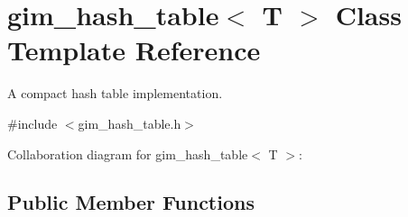 \hypertarget{classgim__hash__table}{\section{gim\+\_\+hash\+\_\+table$<$ T $>$ Class Template Reference}
\label{classgim__hash__table}
}


A compact hash table implementation.  




{\ttfamily \#include $<$gim\+\_\+hash\+\_\+table.\+h$>$}



Collaboration diagram for gim\+\_\+hash\+\_\+table$<$ T $>$\+:
\subsection*{Public Member Functions}
